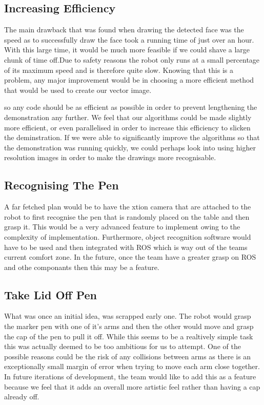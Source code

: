 \documentclass{l3proj}
\begin{document}
\subsection{Increasing Efficiency}
The main drawback that was found when drawing the detected face was the speed as to successfully draw the face took a running time of just over an hour. With this large time, it would be much more feasible if we could shave a large chunk of time off.Due to safety reasons the robot only runs at a small percentage of its maximum speed and is therefore quite slow. Knowing that this is a problem, any major improvement would be in choosing a more efficient method that would be used to create our vector image.


so any code should be as efficient as possible in order to prevent lengthening the demonstration any further. We feel that our algorithms could be made slightly more efficient, or even parallelised in order to increase this efficiency to slicken the deminstration.
If we were able to significantly improve the algorithms so that the demonstration was running quickly, we could perhaps look into using higher resolution images in order to make the drawings more recognisable.

\subsection{Recognising The Pen}
A far fetched plan would be to have the \gls{xtion} camera that are attached to the robot to first recognise the pen that is randomly placed on the table and then grasp it. This would be a very advanced feature to implement owing to the complexity of implementation. Furthermore, object recognition software would have to be used and then integrated with ROS which is way out of the teams current comfort zone. In the future, once the team have a greater grasp on ROS and othe componants then this may be a feature.

\subsection{Take Lid Off Pen}
What was once an initial idea, was scrapped early one. The robot would grasp the marker pen with one of it's arms and then the other would move and grasp the cap of the pen to pull it off. While this seems to be a realtively simple task this was actually deemed to be too ambitious for us to attempt. One of the possible reasons could be the risk of any collisions between arms as there is an exceptionally small margin of error when trying to move each arm close together. In future iterations of development, the team would like to add this as a feature because we feel that it adds an overall more artistic feel rather than having a cap already off.
\end{document}

